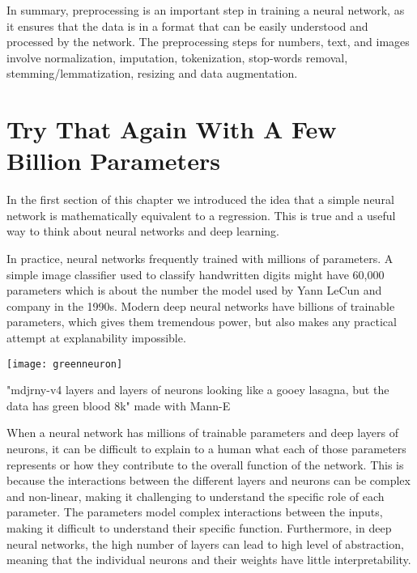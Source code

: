 In summary, preprocessing is an important step in training a neural network, as it ensures that the data is in a format that can be easily understood and processed by the network. The preprocessing steps for numbers, text, and images involve normalization, imputation, tokenization, stop-words removal, stemming/lemmatization, resizing and data augmentation.

\section{Try That Again With A Few Billion Parameters}

In the first section of this chapter we introduced the idea that a simple neural network is mathematically equivalent to a regression. This is true and a useful way to think about neural networks and deep learning.  

In practice, neural networks frequently trained with millions of parameters. A simple image classifier used to classify handwritten digits might have 60,000 parameters which is about the number the model used by Yann LeCun and company in the 1990s. Modern deep neural networks have billions of trainable parameters, which gives them tremendous power, but also makes any practical attempt at explanability impossible.  

\begin{marginfigure}[-5.5cm]
        \texttt{[image: greenneuron]}
        \caption{"mdjrny-v4 layers and layers of neurons looking like a gooey lasagna, but the data has green blood 8k" made with Mann-E}
\end{marginfigure}


When a neural network has millions of trainable parameters and deep layers of neurons, it can be difficult to explain to a human what each of those parameters represents or how they contribute to the overall function of the network. This is because the interactions between the different layers and neurons can be complex and non-linear, making it challenging to understand the specific role of each parameter. The parameters  model complex interactions between the inputs, making it difficult to understand their specific function. Furthermore, in deep neural networks, the high number of layers can lead to high level of abstraction, meaning that the individual neurons and their weights have little interpretability.

